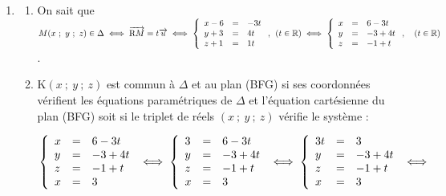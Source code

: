 \documentclass[10pt]{article}
\providecommand{\degres}{\ensuremath{^\circ}}
\providecommand{\R}{\mathbb{R}}
\providecommand{\vect}[1]{\overrightarrow{#1}}
\providecommand{\degres}{{^\circ}}
\begin{document}
\begin{enumerate}
$\bullet~~$ Avec le triangle (IEL) rectangle en L (L projeté orthogonal de I sur (EF) :

On a L$\left(\dfrac32~;~0~;~1\right)$, donc IL$^2 = 0 + 0 + 1^2 = 1$, d'où IL $= 1$ ;

On a vu que EI$ = \dfrac{\sqrt{13}}{2}$, d'où $\cos \left(\widehat{\text{EIL}} \right) = \dfrac{\text{IL}}{\text{IE}} = \dfrac{1}{\dfrac{\sqrt{13}}{2}} = \dfrac{2}{\sqrt{13}}$ : la calculatrice donne $\left(\widehat{\text{EIL}} \right) \approx 56,30\degres$ ; donc 
$\widehat{\text{EIF}} = 2\widehat{\text{EIL}}\approx 2 \times 56,30$, soit finalement $\widehat{\text{EIF}} \approx 112,6\degres$.
\item 




	\begin{enumerate}
		\item 
On sait que $M(x~;~y~;~z) \in \Delta \iff \vect{\text{R}M} = t \vect{u} \iff \left\{\begin{array}{l c l}
x - 6&=&- 3t\\
y + 3&=&4t\\
z + 1&=&1t
\end{array}\right.,\:\:  (t \in \R)\iff \left\{\begin{array}{l c l}
x &=&6 - 3t\\
y &=&- 3 + 4t\\
z &=&- 1 + t
\end{array}\right.,\quad  (t \in \R)$.
		\item 
		



K$(x~;~y~;~z)$ est commun à $\Delta$ et au plan (BFG) si ses coordonnées vérifient les équations paramétriques de $\Delta$ et l'équation cartésienne du plan (BFG) soit si le triplet de réels $(x~;~y~;~z)$ vérifie le système :

$\left\{\begin{array}{l c l}
x &=&6 - 3t\\
y &=&- 3 + 4t\\
z &=&- 1 + t\\
x &=& 3
\end{array}\right. \iff \left\{\begin{array}{l c l}
3 &=&6 - 3t\\
y &=&- 3 + 4t\\
z &=&- 1 + t\\
x &=& 3
\end{array}\right. \iff \left\{\begin{array}{l c l}
3t &=&3\\
y &=&- 3 + 4t\\
z &=&- 1 + t\\
x &=& 3
\end{array}\right.\iff$


\end{enumerate}
\end{enumerate}
\end{document}

